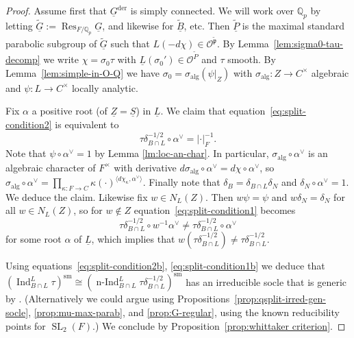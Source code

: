 \documentclass[a4paper]{amsart}
\numberwithin{equation}{section}
\theoremstyle{remark}
\theoremstyle{definition}
\DeclareMathOperator{\Ind}{Ind}
\DeclareMathOperator{\nInd}{n-Ind}
\DeclareMathOperator{\Res}{Res}
\newcommand{\Q}{\mathbb{Q}}
\DeclareMathOperator{\SL}{SL}
\newcommand{\sm}{\mathrm{sm}}
\newcommand{\alggrp}[1]{\underline{#1}}
\newcommand{\der}{\mathrm{der}}
\newcommand{\alg}{\mathrm{alg}}
\newcommand{\ang}[1]{\langle #1\rangle}
\newcommand{\wt}[1]{\widetilde{#1}}
\begin{document}
\begin{proof}
  Assume first that $\alggrp G^\der$ is simply connected.
  We will work over $\Q_p$ by letting $\wt{\alggrp G} := \Res_{F/\Q_p} \alggrp G$, and likewise for $\wt{\alggrp B}$, etc.
  Then $\wt{\alggrp P}$ is the maximal standard parabolic subgroup of $\wt{\alggrp G}$ such that $L(-d\chi) \in \mathcal O^{\wt{\mathfrak p}}$.
  By Lemma~\ref{lem:sigma0-tau-decomp} we write $\chi = \sigma_0 \tau$ with $\underline L(\sigma_0') \in \mathcal O^{\wt P}$ and $\tau$ smooth.
  By Lemma~\ref{lem:simple-in-O-Q} we have $\sigma_0 = \sigma_\alg (\psi|_Z)$ with $\sigma_\alg \colon Z \to C^\times$ algebraic and $\psi \colon L \to C^\times$ locally analytic.
  
  Fix $\alpha$ a positive root (of $\alggrp Z = \alggrp S$) in $\alggrp L$. We claim that equation~\eqref{eq:split-condition2} is equivalent to
  \begin{equation}\label{eq:split-condition2b}
    \tau \delta_{B \cap L}^{-1/2} \circ \alpha^\vee = \lvert \cdot\rvert_F^{-1}.
  \end{equation}
  Note that $\psi \circ \alpha^\vee = 1$ by Lemma \ref{lm:loc-an-char}.
  In particular, $\sigma_\alg \circ \alpha^\vee$ is an algebraic character of $F^\times$ with derivative $d\sigma_\alg \circ \alpha^\vee = d\chi \circ \alpha^\vee$, so 
  $\sigma_\alg \circ \alpha^\vee = \prod_{\kappa\colon F\to C}\kappa(\cdot)^{\ang{d\chi_\kappa,\alpha^\vee}}$.
  Finally note that $\delta_B = \delta_{B \cap L}\delta_N$ and $\delta_N \circ \alpha^\vee = 1$.
  We deduce the claim.
  Likewise fix $w \in N_L(Z)$. Then $w\psi = \psi$ and $w\delta_N = \delta_N$ for all $w \in N_L(Z)$, so for $w \notin Z$ equation~\eqref{eq:split-condition1} becomes
  \begin{equation}\label{eq:split-condition1b}
    \tau \delta_{B \cap L}^{-1/2}\circ w^{-1}\alpha^\vee \ne \tau \delta_{B \cap L}^{-1/2}\circ \alpha^\vee
  \end{equation}
  for some root $\alpha$ of $\alggrp L$, which implies that $w(\tau \delta_{B \cap L}^{-1/2}) \ne \tau \delta_{B \cap L}^{-1/2}$.

  Using equations~\eqref{eq:split-condition2b}, \eqref{eq:split-condition1b} we deduce that $(\Ind_{B \cap L}^L \tau)^\sm \cong (\nInd_{B \cap L}^L \tau\delta_{B \cap L}^{-1/2})^\sm$ has an irreducible socle that is generic by \cite[Proposition 1, Proposition 4]{MR644842}.
  (Alternatively we could argue using Propositions~\ref{prop:qsplit-irred-gen-socle}, \ref{prop:mu-max-parab}, and \ref{prop:G-regular}, using the known reducibility points for $\SL_2(F)$.)
  We conclude by Proposition~\ref{prop:whittaker criterion}.


\end{proof}
\end{document}

